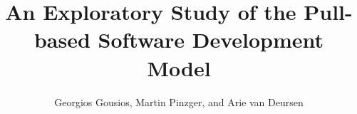 \documentclass[letterpaper,twoside,10pt]{book}
\title{An Exploratory Study of the Pull-based Software Development Model}
\author{Georgios Gousios, Martin Pinzger, and Arie van Deursen}
\begin{document}
\maketitle




\makebackpage
\end{document}
